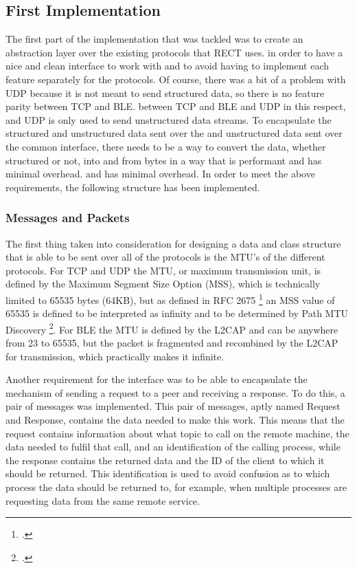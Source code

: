 \subsection{First Implementation}
The first part of the implementation that was tackled was to create an abstraction layer over the existing protocols that RECT uses.
in order to have a nice and clean interface to work with and to avoid having to implement each feature separately for the
protocols. Of course, there was a bit of a problem with UDP because it is not meant to send structured data, so there is no feature parity between TCP and BLE.
between TCP and BLE and UDP in this respect, and UDP is only used to send unstructured data streams. To encapsulate the structured and unstructured data sent over the
and unstructured data sent over the common interface, there needs to be a way to convert the data, whether structured or not, into and from bytes in a way that is performant and has minimal overhead.
and has minimal overhead. In order to meet the above requirements, the following structure has been implemented.
 
\subsubsection{Messages and Packets}
The first thing taken into consideration for designing a data and class structure that is able to be sent over all of the protocols is the MTU's of the different protocols. 
For TCP and UDP the MTU, or maximum transmission unit, is defined by the Maximum Segment Size Option (MSS), which is technically limited to 65535 bytes (64KB), but as defined
in RFC 2675 \footcite{rfc2675} an MSS value of 65535 is defined to be interpreted as infinity and to be determined by Path MTU Discovery \footcite{rfc9293}. For BLE the MTU is 
defined by the L2CAP and can be anywhere from 23 to 65535, but the packet is fragmented and recombined by the L2CAP for transmission, which practically makes it infinite. %

Another requirement for the interface was to be able to encapsulate the mechanism of sending a request to a peer and receiving a response. 
To do this, a pair of messages was implemented. This pair of messages, aptly named Request and Response, contains the data needed to make this work. This means 
that the request contains information about what topic to call on the remote machine, the data needed to fulfil that call, and an identification of the calling process, 
while the response contains the returned data and the ID of the client to which it should be returned. This identification is used to avoid confusion as to which process the data should be returned to, 
for example, when multiple processes are requesting data from the same remote service.

